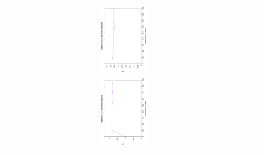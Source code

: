 \begin{figure}[h]
\begin{tabular}{ccc}
   \includegraphics[width=0.2\textwidth,angle=-90,origin=c]{Figures_Chapter7/Results_Chapter3/EPS_DI/3obj_DTLZ6.eps}
   \\
  \includegraphics[width=0.2\textwidth, angle=-90,origin=c]{Figures_Chapter7/Results_Chapter3/EPS_DI/3obj_DTLZ7.eps}
\end{tabular}
\end{figure}


